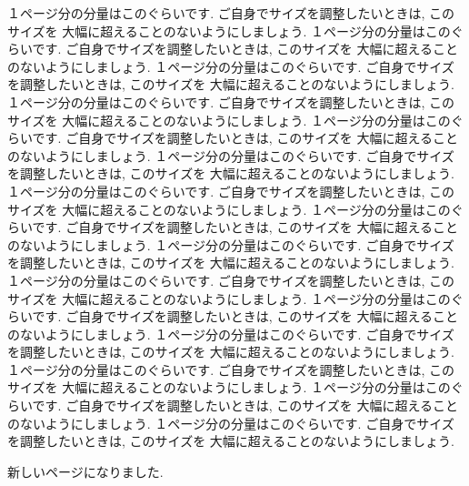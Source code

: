 \documentclass[12pt,a4j,twoside]{jreport}
\numberwithin{equation}{chapter}
\theoremstyle{definition} %
\begin{document}
１ページ分の分量はこのぐらいです. 
ご自身でサイズを調整したいときは, このサイズを
大幅に超えることのないようにしましょう. 
１ページ分の分量はこのぐらいです. 
ご自身でサイズを調整したいときは, このサイズを
大幅に超えることのないようにしましょう. 
１ページ分の分量はこのぐらいです. 
ご自身でサイズを調整したいときは, このサイズを
大幅に超えることのないようにしましょう. 
１ページ分の分量はこのぐらいです. 
ご自身でサイズを調整したいときは, このサイズを
大幅に超えることのないようにしましょう. 
１ページ分の分量はこのぐらいです. 
ご自身でサイズを調整したいときは, このサイズを
大幅に超えることのないようにしましょう. 
１ページ分の分量はこのぐらいです. 
ご自身でサイズを調整したいときは, このサイズを
大幅に超えることのないようにしましょう. 
１ページ分の分量はこのぐらいです. 
ご自身でサイズを調整したいときは, このサイズを
大幅に超えることのないようにしましょう. 
１ページ分の分量はこのぐらいです. 
ご自身でサイズを調整したいときは, このサイズを
大幅に超えることのないようにしましょう. 
１ページ分の分量はこのぐらいです. 
ご自身でサイズを調整したいときは, このサイズを
大幅に超えることのないようにしましょう. 
１ページ分の分量はこのぐらいです. 
ご自身でサイズを調整したいときは, このサイズを
大幅に超えることのないようにしましょう. 
１ページ分の分量はこのぐらいです. 
ご自身でサイズを調整したいときは, このサイズを
大幅に超えることのないようにしましょう. 
１ページ分の分量はこのぐらいです. 
ご自身でサイズを調整したいときは, このサイズを
大幅に超えることのないようにしましょう. 
１ページ分の分量はこのぐらいです. 
ご自身でサイズを調整したいときは, このサイズを
大幅に超えることのないようにしましょう. 
１ページ分の分量はこのぐらいです. 
ご自身でサイズを調整したいときは, このサイズを
大幅に超えることのないようにしましょう. 
１ページ分の分量はこのぐらいです. 
ご自身でサイズを調整したいときは, このサイズを
大幅に超えることのないようにしましょう. 




新しいページになりました. 
\end{document}
